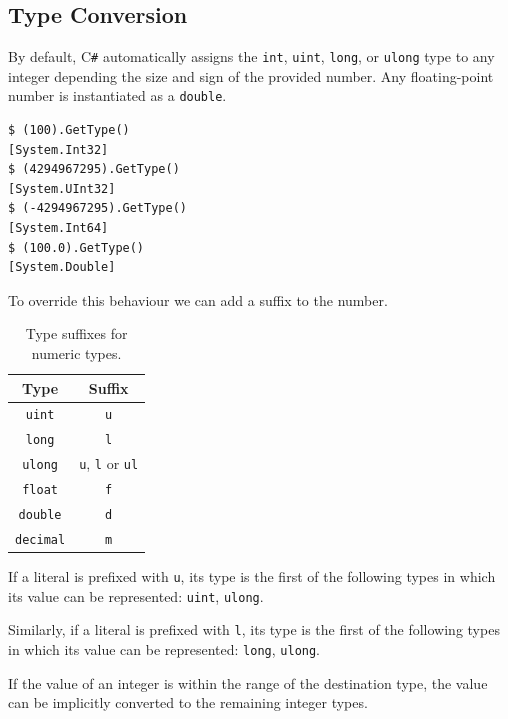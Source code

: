 \documentclass{article}
\begin{document}
\subsection{Type Conversion}
By default, C\texttt{\#} automatically assigns the \lstinline!int!, \lstinline!uint!,
\lstinline!long!, or \lstinline!ulong! type to any integer depending the size and sign
of the provided number. Any floating-point number is instantiated as a \lstinline!double!.
\begin{lstlisting}
$ (100).GetType()
[System.Int32]
$ (4294967295).GetType()    
[System.UInt32]
$ (-4294967295).GetType()
[System.Int64]
$ (100.0).GetType()
[System.Double]
\end{lstlisting}
To override this behaviour we can add a suffix to the number.
\begin{table}[H]
    \centering
    \begin{tabular}{c c}
        \toprule
        \textbf{Type}       & \textbf{Suffix}                                \\
        \midrule
        \lstinline!uint!    & \lstinline!u!                                  \\
        \lstinline!long!    & \lstinline!l!                                  \\
        \lstinline!ulong!   & \lstinline!u!, \lstinline!l! or \lstinline!ul! \\
        \midrule
        \lstinline!float!   & \lstinline!f!                                  \\
        \lstinline!double!  & \lstinline!d!                                  \\
        \lstinline!decimal! & \lstinline!m!                                  \\
        \bottomrule
    \end{tabular}
    \caption{Type suffixes for numeric types.}
\end{table}
If a literal is prefixed with \lstinline!u!, its type is the first
of the following types in which its value can be represented:
\lstinline!uint!, \lstinline!ulong!.

Similarly, if a literal is prefixed with \lstinline!l!, its type is the first
of the following types in which its value can be represented:
\lstinline!long!, \lstinline!ulong!.

If the value of an integer is within the range of the destination type,
the value can be implicitly converted to the remaining integer types.
\end{document}
